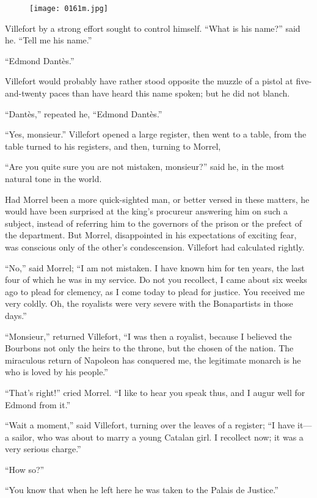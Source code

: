\begin{figure}[h]
\texttt{[image: 0161m.jpg]}
\end{figure}

Villefort by a strong effort sought to control himself. “What is his
name?” said he. “Tell me his name.”

“Edmond Dantès.”

Villefort would probably have rather stood opposite the muzzle of a
pistol at five-and-twenty paces than have heard this name spoken; but
he did not blanch.

“Dantès,” repeated he, “Edmond Dantès.”

“Yes, monsieur.” Villefort opened a large register, then went to a
table, from the table turned to his registers, and then, turning to
Morrel,

“Are you quite sure you are not mistaken, monsieur?” said he, in the
most natural tone in the world.

Had Morrel been a more quick-sighted man, or better versed in these
matters, he would have been surprised at the king’s procureur answering
him on such a subject, instead of referring him to the governors of the
prison or the prefect of the department. But Morrel, disappointed in
his expectations of exciting fear, was conscious only of the other’s
condescension. Villefort had calculated rightly.

“No,” said Morrel; “I am not mistaken. I have known him for ten years,
the last four of which he was in my service. Do not you recollect, I
came about six weeks ago to plead for clemency, as I come today to
plead for justice. You received me very coldly. Oh, the royalists were
very severe with the Bonapartists in those days.”

“Monsieur,” returned Villefort, “I was then a royalist, because I
believed the Bourbons not only the heirs to the throne, but the chosen
of the nation. The miraculous return of Napoleon has conquered me, the
legitimate monarch is he who is loved by his people.”

“That’s right!” cried Morrel. “I like to hear you speak thus, and I
augur well for Edmond from it.”

“Wait a moment,” said Villefort, turning over the leaves of a register;
“I have it—a sailor, who was about to marry a young Catalan girl. I
recollect now; it was a very serious charge.”

“How so?”

“You know that when he left here he was taken to the Palais de
Justice.”

